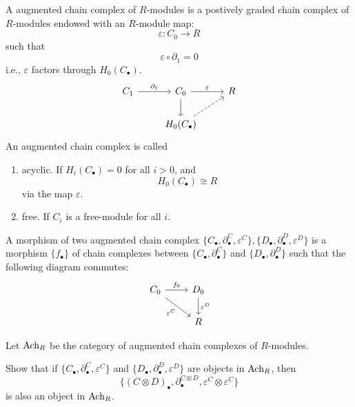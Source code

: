 \begin{defn}[augmented CC]
    A augmented chain complex of $R$-modules is a postively graded chain complex of $R$-modules endowed with an $R$-module map:
    \begin{equation*}
        \varepsilon:C_0\to R
    \end{equation*}
    such that 
    \begin{equation*}
        \varepsilon\circ\partial_1=0
    \end{equation*}
    i.e., $\varepsilon$ factors through $H_0(C_\bullet)$.
    \[\begin{tikzcd}
        {C_1} & {C_0} & R \\
        & {H_0(C_\bullet)}
        \arrow["{\partial_1}", from=1-1, to=1-2]
        \arrow["\varepsilon", from=1-2, to=1-3]
        \arrow[from=1-2, to=2-2]
        \arrow[dashed, from=2-2, to=1-3]
    \end{tikzcd}\]
    An augmented chain complex is called 
    \begin{enumerate}
        \item acyclic. If $H_i(C_\bullet)=0$ for all $i>0$, and 
        \begin{equation*}
            H_0(C_\bullet)\cong R
        \end{equation*}
        via the map $\varepsilon$.
        \item free. If $C_i$ is a free-module for all $i$.
    \end{enumerate}
    A morphism of two augmented chain complex $\{C_\bullet,\partial_\bullet^C,\varepsilon^C\}, \{D_\bullet,\partial_\bullet^D,\varepsilon^D\}$ is a morphism $\{f_\bullet\}$ of chain complexes between $\{C_\bullet, \partial_\bullet^C\}$ and $\{D_\bullet,\partial_\bullet^D\}$ such that the following diagram commutes:
    \[\begin{tikzcd}
        {C_0} & {D_0} \\
        & R
        \arrow["{f_0}", from=1-1, to=1-2]
        \arrow["{\varepsilon^C}"', from=1-1, to=2-2]
        \arrow["{\varepsilon^D}", from=1-2, to=2-2]
    \end{tikzcd}\]
\end{defn}
\begin{defn}[$\ach_R$]
    Let $\ach_R$ be the category of augmented chain complexes of $R$-modules.
\end{defn}
\begin{prob}[HW(2.12)]
    Show that if $\{C_\bullet,\partial_\bullet^C, \varepsilon^C\}$ and $\{D_\bullet,\partial_\bullet^D, \varepsilon^D\}$ are objects in $\ach_R$, then 
    \begin{equation*}
        \{(C\otimes D)_\bullet, \partial_\bullet^{C\otimes D}, \varepsilon^C\otimes\varepsilon^C\}
    \end{equation*}
    is also an object in $\ach_R$.
\end{prob}
